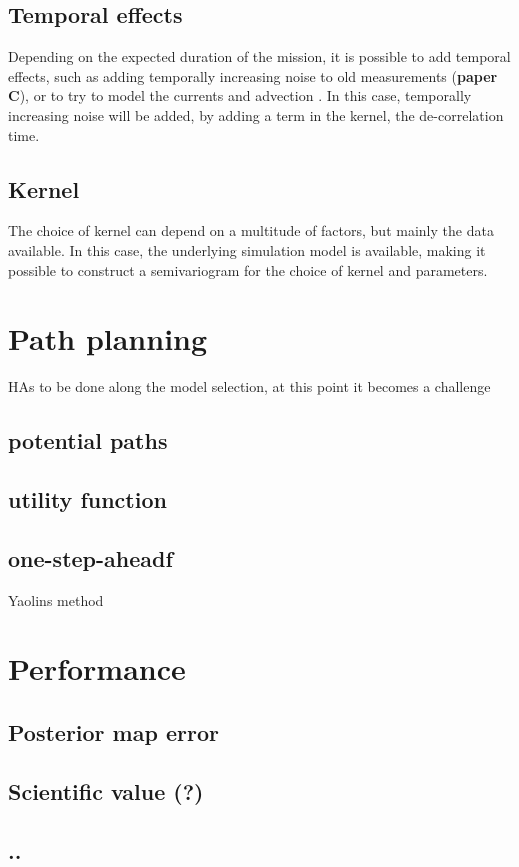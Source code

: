 \subsection{Temporal effects}
Depending on the expected duration of the mission, it is possible to add temporal effects, such as adding temporally increasing noise to old measurements (\textbf{paper C}), or to try to model the currents and advection \cite{berget2022adaptive}. In this case, temporally increasing noise will be added, by adding a term in the kernel, the de-correlation time. 

\subsection{Kernel}
The choice of kernel can depend on a multitude of factors, but mainly the data available. In this case, the underlying simulation model is available, making it possible to construct a semivariogram for the choice of kernel and parameters. 

\section{Path planning}
HAs to be done along the model selection, at this point it becomes a challenge
\subsection{potential paths}
\subsection{utility function}
\subsection{one-step-aheadf}
Yaolins method

\section{Performance}
\subsection{Posterior map error}
\subsection{Scientific value (?)}
\subsection{..}

